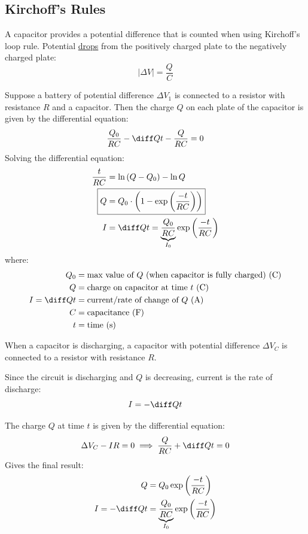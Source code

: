 \documentclass{article}
\newcommand{\theorem}[2]{\begin{tcolorbox}[title={#1},colback=blue!5!white,colframe=blue!75!black,parbox=false] #2 \end{tcolorbox}}
\begin{document}
\subsection{Kirchoff's Rules}

A capacitor provides a potential difference that is counted when using Kirchoff's loop rule. Potential \ul{drops} from the positively charged plate to the negatively charged plate:
\begin{equation*}
    \left|\Delta V\right|
	=\frac{Q}{C}
\end{equation*}

\theorem{RC circuit charging}{
	Suppose a battery of potential difference $\Delta V_1$ is connected to a resistor with resistance $R$ and a capacitor. Then the charge $Q$ on each plate of the capacitor is given by the differential equation:
	\begin{equation*}
		\frac{Q_0}{RC}-\diff Qt-\frac{Q}{RC}=0
	\end{equation*}
	Solving the differential equation:
	\begin{align*}
		\frac{t}{RC}&=\ln\left(Q-Q_0\right)-\ln Q \\
		\Aboxed{Q&=Q_0\cdot\left(1-\exp\left(\frac{-t}{RC}\right)\right)} \\
		I&=\diff Qt=\underbrace{\frac{Q_0}{RC}}_{I_0}\exp\left(\frac{-t}{RC}\right)
	\end{align*}
	where:
	\begin{align*}
		Q_0&=\text{max value of $Q$ (when capacitor is fully charged) (C)} \\
		Q&=\text{charge on capacitor at time $t$ (C)} \\
		I=\diff Qt&=\text{current/rate of change of $Q$ (A)} \\
		C&=\text{capacitance (F)} \\
		t&=\text{time (s)}
	\end{align*}
}

When a capacitor is discharging, a capacitor with potential difference $\Delta V_C$ is connected to a resistor with resistance $R$. 

Since the circuit is discharging and $Q$ is decreasing, current is the rate of discharge:
\begin{equation*}
    I=-\diff Qt
\end{equation*}

\theorem{RC circuit discharging}{
	The charge $Q$ at time $t$ is given by the differential equation:
	\begin{equation*}
	    \Delta V_C-IR=0
		\implies \frac{Q}{RC}+\diff Qt=0
	\end{equation*}
	Gives the final result:
	\begin{align*}
		Q&=Q_0\exp\left(\frac{-t}{RC}\right) \\
		I=-\diff Qt&=\underbrace{\frac{Q_0}{RC}}_{I_0} \exp \left( \frac{-t}{RC} \right)
	\end{align*}
}
\end{document}
